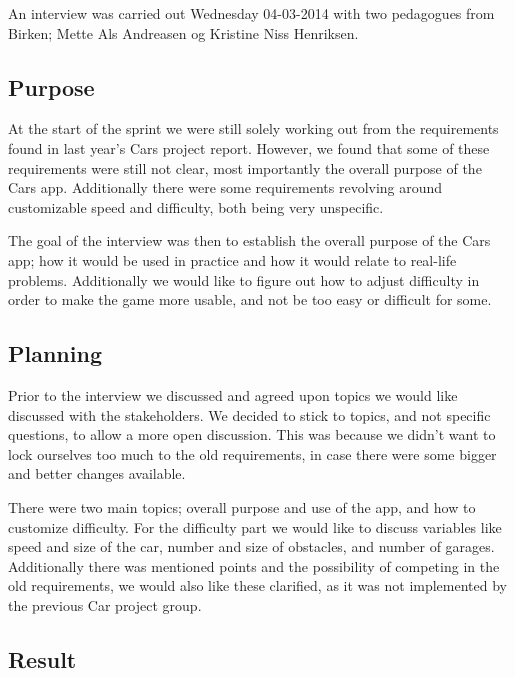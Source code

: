 An interview was carried out Wednesday 04-03-2014 with two pedagogues from Birken; Mette Als Andreasen og Kristine Niss Henriksen.

\subsection{Purpose}
At the start of the sprint we were still solely working out from the requirements found in last year's Cars project report.
However, we found that some of these requirements were still not clear, most importantly the overall purpose of the Cars app.
Additionally there were some requirements revolving around customizable speed and difficulty, both being very unspecific.

The goal of the interview was then to establish the overall purpose of the Cars app; how it would be used in practice and how it would relate to real-life problems.
Additionally we would like to figure out how to adjust difficulty in order to make the game more usable, and not be too easy or difficult for some.

\subsection{Planning}
Prior to the interview we discussed and agreed upon topics we would like discussed with the stakeholders.
We decided to stick to topics, and not specific questions, to allow a more open discussion.
This was because we didn't want to lock ourselves too much to the old requirements, in case there were some bigger and better changes available.

There were two main topics; overall purpose and use of the app, and how to customize difficulty.
For the difficulty part we would like to discuss variables like speed and size of the car, number and size of obstacles, and number of garages.
Additionally there was mentioned points and the possibility of competing in the old requirements, we would also like these clarified, as it was not implemented by the previous Car project group.

\subsection{Result}

